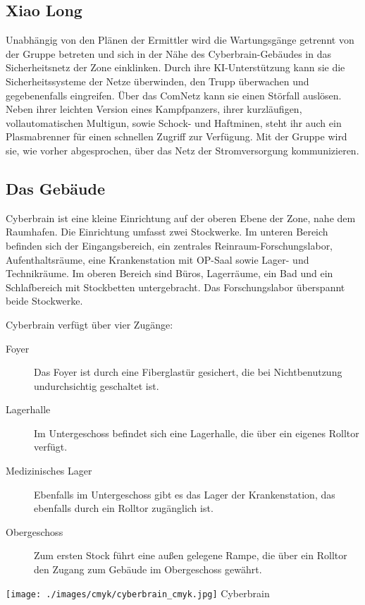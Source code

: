 \subsection[\xl{}]{Xiao Long} 
Unabhängig von den Plänen der Ermittler wird \xl{} die Wartungsgänge getrennt von der Gruppe betreten und sich in der Nähe des Cyberbrain-Gebäudes in das Sicherheitsnetz der Zone einklinken. Durch ihre KI-Unterstützung kann sie die Sicherheitssysteme der Netze überwinden, den Trupp überwachen und gegebenenfalls eingreifen. Über das ComNetz kann sie einen Störfall auslösen. Neben ihrer leichten Version eines Kampfpanzers, ihrer kurzläufigen, vollautomatischen Multigun, sowie Schock- und Haftminen, steht ihr auch ein Plasmabrenner für einen schnellen Zugriff zur Verfügung. Mit der Gruppe wird sie, wie vorher abgesprochen, über das Netz der Stromversorgung kommunizieren.

\subsection{Das Gebäude} 
Cyberbrain ist eine kleine Einrichtung auf der oberen Ebene der Zone, nahe dem Raumhafen. Die Einrichtung umfasst zwei Stockwerke. Im unteren Bereich befinden sich der Eingangsbereich, ein zentrales Reinraum-Forschungslabor, Aufenthaltsräume, eine Krankenstation mit OP-Saal sowie Lager- und Technikräume. Im oberen Bereich sind Büros, Lagerräume, ein Bad und ein Schlafbereich mit Stockbetten untergebracht. Das Forschungslabor überspannt beide Stockwerke.

Cyberbrain verfügt über vier Zugänge:

\begin{description}
	\item[Foyer] Das Foyer ist durch eine Fiberglastür gesichert, die bei Nichtbenutzung undurchsichtig geschaltet ist.
	\item[Lagerhalle] Im Untergeschoss befindet sich eine Lagerhalle, die über ein eigenes Rolltor verfügt.
	\item[Medizinisches Lager] Ebenfalls im Untergeschoss gibt es das Lager der Krankenstation, das ebenfalls durch ein Rolltor zugänglich 		ist.
	\item[Obergeschoss] Zum ersten Stock führt eine außen gelegene Rampe, die über ein Rolltor den Zugang zum Gebäude im Obergeschoss 	
		gewährt.
\end{description}

\begin{figure*}[htbp]
	\centering
    \texttt{[image: ./images/cmyk/cyberbrain\_cmyk.jpg]}
    \newline{}Cyberbrain
	\label{fig:cyberbrain}
\end{figure*}


